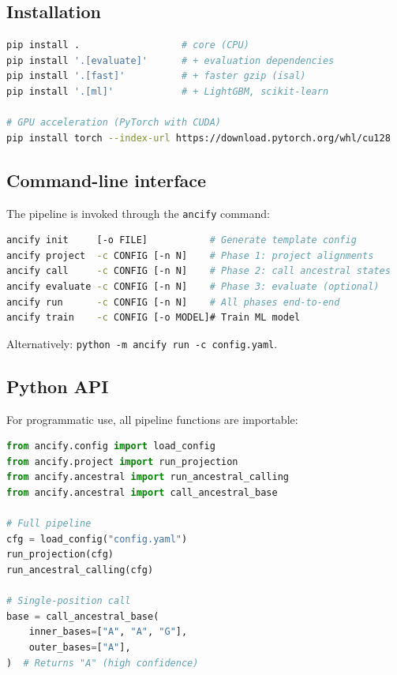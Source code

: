 \documentclass[11pt,a4paper]{article}
\begin{document}
\subsection{Installation}

\begin{lstlisting}[language=bash,numbers=none]
pip install .                  # core (CPU)
pip install '.[evaluate]'      # + evaluation dependencies
pip install '.[fast]'          # + faster gzip (isal)
pip install '.[ml]'            # + LightGBM, scikit-learn

# GPU acceleration (PyTorch with CUDA)
pip install torch --index-url https://download.pytorch.org/whl/cu128
\end{lstlisting}

\subsection{Command-line interface}

The pipeline is invoked through the \texttt{ancify} command:

\begin{lstlisting}[language=bash,numbers=none]
ancify init     [-o FILE]           # Generate template config
ancify project  -c CONFIG [-n N]    # Phase 1: project alignments
ancify call     -c CONFIG [-n N]    # Phase 2: call ancestral states
ancify evaluate -c CONFIG [-n N]    # Phase 3: evaluate (optional)
ancify run      -c CONFIG [-n N]    # All phases end-to-end
ancify train    -c CONFIG [-o MODEL]# Train ML model
\end{lstlisting}

Alternatively: \texttt{python -m ancify run -c config.yaml}.

\subsection{Python API}

For programmatic use, all pipeline functions are importable:

\begin{lstlisting}[language=Python,caption={Programmatic usage of the ancify
Python API.},label={lst:api}]
from ancify.config import load_config
from ancify.project import run_projection
from ancify.ancestral import run_ancestral_calling
from ancify.ancestral import call_ancestral_base

# Full pipeline
cfg = load_config("config.yaml")
run_projection(cfg)
run_ancestral_calling(cfg)

# Single-position call
base = call_ancestral_base(
    inner_bases=["A", "A", "G"],
    outer_bases=["A"],
)  # Returns "A" (high confidence)
\end{lstlisting}
\end{document}
